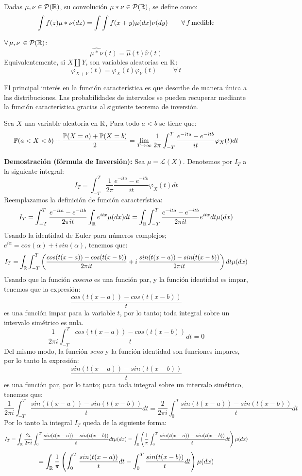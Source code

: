\begin{definicion} Dadas $\mu,\nu \in \mathcal{P}(\mathbb R)$, su convolución $\mu\ast \nu \in \mathcal{P}(\mathbb R)$, se define como:
\[\int f(z)\mu\ast\nu(dz) = \int\int f(x+y)\mu(dx)\nu(dy)\hspace{0.7cm}\forall\,f\,\text{medible}\]
\end{definicion}
\begin{prop}$\forall\,\mu,\nu\,\in\mathcal{P}(\mathbb R)$:
\[\widehat{\mu\ast\nu}(t) = \hat{\mu}(t)\hat{\nu}(t)\]
Equivalentemente, si $X\amalg Y$, son variables aleatorias en $\mathbb R$:
\[\varphi_{X+Y}(t) = \varphi_X(t)\varphi_Y(t)\hspace{1cm}\forall\,t\]
\end{prop}

El principal interés en la función característica es que describe de manera única a las distribuciones. Las probabilidades de intervalos se pueden recuperar mediante la función característica gracias al siguiente teorema de inversión.

\begin{teorema} Sea $X$ una variable aleatoria en $\mathbb R$, Para todo $a<b$ se tiene que:
\[\mathbb{P}(a<X<b) + \frac{\mathbb{P}(X=a)+\mathbb{P}(X=b)}{2} = \lim_{T\rightarrow \infty}\frac{1}{2\pi}\int_{-T}^{T}\frac{e^{-ita}-e^{-itb}}{it}\varphi_X(t)dt\]
\end{teorema}
\textbf{Demostración (fórmula de Inversión):} Sea $\mu = \mathcal{L}(X)$. Denotemos por $I_T$ a la siguiente integral:
\[I_T = \int_{-T}^{T}\frac{1}{2\pi}\frac{e^{-ita}-e^{-itb}}{it}\varphi_X(t) dt\]
Reemplazamos la definición de función característica:
\[I_T = \int_{-T}^{T}\frac{e^{-ita}-e^{-itb}}{2\pi it}\int_{\mathbb R}e^{itx}\mu(dx) dt = \int_{\mathbb R}\int_{-T}^{T}\frac{e^{-ita}-e^{-itb}}{2\pi it}e^{itx}dt\mu(dx)\]
Usando la identidad de Euler para números complejos; $e^{i\alpha} = cos(\alpha)+i\,sin(\alpha)$, tenemos que:
\[I_T = \int_{\mathbb R}\int_{-T}^{T}\left(\frac{cos(t(x-a))-cos(t(x-b))}{2\pi it} + i\,\frac{sin(t(x-a))-sin(t(x-b))}{2\pi it}\right)dt \mu(dx)\]
Usando que la función \textit{coseno} es una función par, y la función identidad es impar, tenemos que la expresión:
\[\frac{cos(t(x-a))-cos(t(x-b))}{t}\]
es una función impar para la variable $t$, por lo tanto; toda integral sobre un intervalo simétrico es nula.
\[\frac{1}{2\pi i}\int_{-T}^{T}\frac{cos(t(x-a))-cos(t(x-b))}{t} dt = 0\]
Del mismo modo, la función \textit{seno} y la función identidad son funciones impares, por lo tanto la expresión:
\[\frac{sin(t(x-a))-sin(t(x-b))}{t}\]
es una función par, por lo tanto; para toda integral sobre un intervalo simétrico, tenemos que:
\[\frac{1}{2\pi i}\int_{-T}^{T}\frac{sin(t(x-a))-sin(t(x-b))}{t}dt = \frac{2}{2\pi i}\int_{0}^{T}\frac{sin(t(x-a))-sin(t(x-b))}{t}dt\]
Por lo tanto la integral $I_T$ queda de la siguiente forma:
\[I_T = \int_{\mathbb R}\frac{2i}{2\pi i}\int_{0}^{T}\frac{sin(t(x-a))-sin(t(x-b))}{t}dt \mu(dx)=\int_{\mathbb R}\left(\frac{1}{\pi }\int_{0}^{T}\frac{sin(t(x-a))-sin(t(x-b))}{t}dt\right) \mu(dx)\]
\[= \int_{\mathbb R}\frac{1}{\pi}\left(\int_{0}^{T}\frac{sin(t(x-a))}{t}dt - \int_{0}^{T}\frac{sin(t(x-b))}{t}dt\right) \mu(dx)\]

